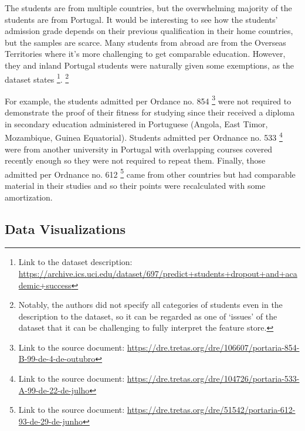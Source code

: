 \documentclass[
  letterpaper,
  DIV=11,
  numbers=noendperiod]{scrartcl}
\begin{document}
The students are from multiple countries, but the overwhelming majority
of the students are from Portugal. It would be interesting to see how
the students' admission grade depends on their previous qualification in
their home countries, but the samples are scarce. Many students from
abroad are from the Overseas Territories where it's more challenging to
get comparable education. However, they and inland Portugal students
were naturally given some exemptions, as the dataset states \footnote{Link
  to the dataset description:
  \url{https://archive.ics.uci.edu/dataset/697/predict+students+dropout+and+academic+success}}.
\footnote{Notably, the authors did not specify all categories of
  students even in the description to the dataset, so it can be regarded
  as one of \enquote*{issues} of the dataset that it can be challenging
  to fully interpret the feature store.}

For example, the students admitted per Ordance no. 854 \footnote{Link to
  the source document:
  \url{https://dre.tretas.org/dre/106607/portaria-854-B-99-de-4-de-outubro}}
were not required to demonstrate the proof of their fitness for studying
since their received a diploma in secondary education administered in
Portuguese (Angola, East Timor, Mozambique, Guinea Equatorial). Students
admitted per Ordnance no. 533 \footnote{Link to the source document:
  \url{https://dre.tretas.org/dre/104726/portaria-533-A-99-de-22-de-julho}}
were from another university in Portugal with overlapping courses
covered recently enough so they were not required to repeat them.
Finally, those admitted per Ordnance no. 612 \footnote{Link to the
  source document:
  \url{https://dre.tretas.org/dre/51542/portaria-612-93-de-29-de-junho}}
came from other countries but had comparable material in their studies
and so their points were recalculated with some amortization.

\hypertarget{data-visualizations}{%
\subsection{Data Visualizations}\label{data-visualizations}}
\end{document}
